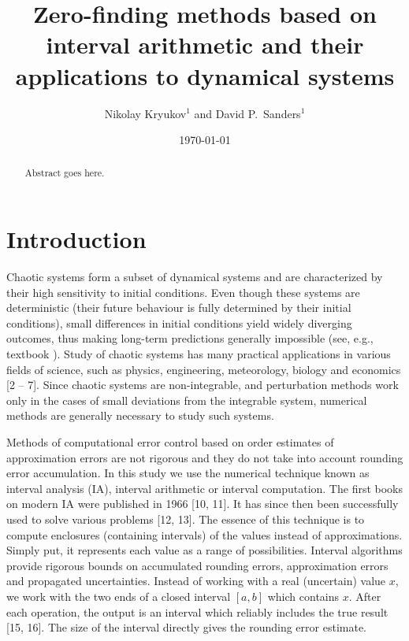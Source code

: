 \documentclass[pre, amsmath, amssymb, onecolumn, showpacs]{revtex4-1}
\begin{document}
\title{Zero-finding methods based on interval arithmetic and their applications to dynamical systems}

\author{Nikolay Kryukov$^{1}$ and David P.~Sanders$^{1}$}

\address{$^{1}$Departamento de F\'isica, Facultad de Ciencias, Universidad Nacional
Aut\'onoma de M\'exico,
Ciudad Universitaria, M\'exico D.F.\ 04510, Mexico
}

 \date{\today}


\begin{abstract}

Abstract goes here.

\end{abstract}

\maketitle


%

\section{Introduction}

Chaotic systems form a subset of dynamical systems and are characterized by their high sensitivity to initial conditions. Even though these systems are deterministic (their future behaviour is fully determined by their initial conditions), small differences in initial conditions yield widely diverging outcomes, thus making long-term predictions generally impossible (see, e.g., textbook \cite{goldstein}). Study of chaotic systems has many practical applications in various fields of science, such as physics, engineering, meteorology, biology and economics [2 – 7]. Since chaotic systems are non-integrable, and perturbation methods work only in the cases of small deviations from the integrable system, numerical methods are generally necessary to study such systems.

Methods of computational error control based on order estimates of approximation errors are not rigorous and they do not take into account rounding error accumulation. In this study we use the numerical technique known as interval analysis (IA), interval arithmetic or interval computation. The first books on modern IA were published in 1966 [10, 11]. It has since then been successfully used to solve various problems [12, 13]. The essence of this technique is to compute enclosures (containing intervals) of the values instead of approximations. Simply put, it represents each value as a range of possibilities. Interval algorithms provide rigorous bounds on accumulated rounding errors, approximation errors and propagated uncertainties. Instead of working with a real (uncertain) value $x$, we work with the two ends of a closed interval $[a, b]$ which contains $x$. After each operation, the output is an interval which reliably includes the true result [15, 16]. The size of the interval directly gives the rounding error estimate.
\end{document}
